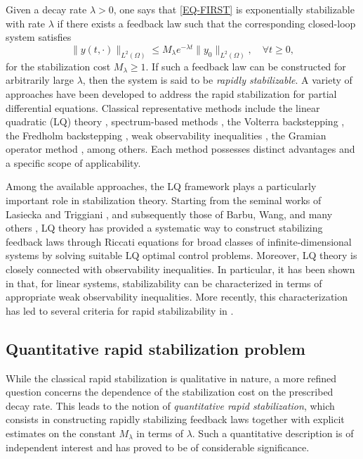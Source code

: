 \documentclass[a4paper]{article}
\numberwithin{equation}{section}
\begin{document}
Given a decay rate $\lambda>0$, one says that \eqref{EQ-FIRST} is exponentially stabilizable with rate $\lambda$ if there exists a feedback law such that the corresponding closed-loop system satisfies
$$\|y(t,\cdot)\|_{L^2(\Omega)}\le M_\lambda e^{-\lambda t}\|y_0\|_{L^2(\Omega)},\quad \forall t\ge 0,$$
for the stabilization cost $M_\lambda\ge 1$. If such a feedback law can be constructed for arbitrarily large $\lambda$, then the system is said to be \textit{rapidly stabilizable}. A variety of approaches have been developed to address the rapid stabilization for partial differential equations. Classical representative methods include the linear quadratic (LQ) theory \cite{B2,BW,LT}, spectrum-based methods \cite{BT2,CT1,KF,X2}, the Volterra backstepping \cite{BK,CN}, the Fredholm backstepping \cite{CL, GHMXZ,WaterWave}, weak observability inequalities \cite{LWXY,TWX}, the Gramian operator method \cite{Nyu,Urquiza}, among others. Each method possesses distinct advantages and a specific scope of applicability.

Among the available approaches, the LQ framework plays a particularly important role in stabilization theory. Starting from the seminal works of Lasiecka and Triggiani \cite{LT}, and subsequently those of Barbu, Wang, and many others \cite{B2,BR,BW}, LQ theory has provided a systematic way to construct stabilizing feedback laws through Riccati equations for broad classes of infinite-dimensional systems by solving suitable LQ optimal control problems. Moreover, LQ theory is closely connected with observability inequalities. In particular, it has been shown in \cite{TWX} that, for linear systems, stabilizability can be characterized in terms of appropriate weak observability inequalities. More recently, this characterization has led to several criteria for rapid stabilizability in \cite{KWY,LWXY}.

\subsection{Quantitative rapid stabilization problem}\label{subsec1.1}
While the classical rapid stabilization is qualitative in nature, a more refined question concerns the dependence of the stabilization cost on the prescribed decay rate. This leads to the notion of \textit{quantitative rapid stabilization}, which consists in constructing rapidly stabilizing feedback laws together with explicit estimates on the constant $M_\lambda$ in terms of $\lambda$. Such a quantitative description is of independent interest and has proved to be of considerable significance.
\end{document}
